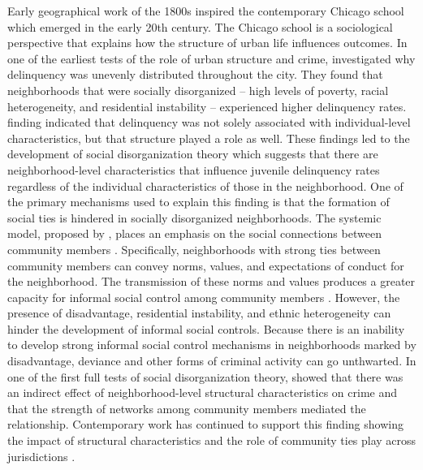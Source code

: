 Early geographical work of the 1800s inspired the contemporary Chicago school which emerged in the early 20th century. The Chicago school is a sociological perspective that explains how the structure of urban life influences outcomes. In one of the earliest tests of the role of urban structure and crime, \textcite{shaw_juvenile_1942} investigated why delinquency was unevenly distributed throughout the city. They found that neighborhoods that were socially disorganized – high levels of poverty, racial heterogeneity, and residential instability – experienced higher delinquency rates. \textcite{shaw_juvenile_1942} finding indicated that delinquency was not solely associated with individual-level characteristics, but that structure played a role as well. These findings led to the development of social disorganization theory which suggests that there are neighborhood-level characteristics that influence juvenile delinquency rates regardless of the individual characteristics of those in the neighborhood. One of the primary mechanisms used to explain this finding is that the formation of social ties is hindered in socially disorganized neighborhoods. The systemic model, proposed by \textcite{kasarda_community_1974}, places an emphasis on the social connections between community members \parencite{bursik_jr_economic_1993, bursik_systemic_2000}. Specifically, neighborhoods with strong ties between community members can convey norms, values, and expectations of conduct for the neighborhood. The transmission of these norms and values produces a greater capacity for informal social control among community members \parencite{kornhauser_social_1978}. However, the presence of disadvantage, residential instability, and ethnic heterogeneity can hinder the development of informal social controls. Because there is an inability to develop strong informal social control mechanisms in neighborhoods marked by disadvantage, deviance and other forms of criminal activity can go unthwarted. In one of the first full tests of social disorganization theory, \textcite{sampson_community_1989} showed that there was an indirect effect of neighborhood-level structural characteristics on crime and that the strength of networks among community members mediated the relationship. Contemporary work has continued to support this finding showing the impact of structural characteristics and the role of community ties play across jurisdictions \parencite{bursik_systemic_2000, levy_triple_2020, sampson_great_2012, sampson_neighborhoods_1997}.

